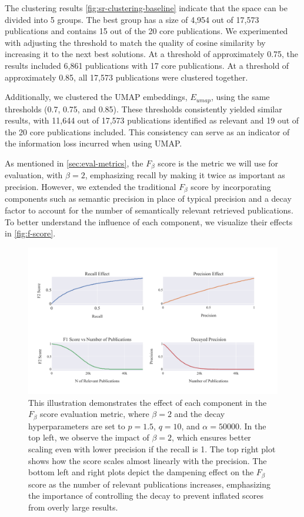 The clustering results \autoref{fig:sr-clustering-baseline} indicate that the space can be divided into 5 groups. The best group has a size of 4,954 out of 17,573 publications and contains 15 out of the 20 core publications. We experimented with adjusting the threshold to match the quality of cosine similarity by increasing it to the next best solutions. At a threshold of approximately 0.75, the results included 6,861 publications with 17 core publications. At a threshold of approximately 0.85, all 17,573 publications were clustered together.

Additionally, we clustered the UMAP embeddings, $E_{umap}$, using the same thresholds (0.7, 0.75, and 0.85). These thresholds consistently yielded similar results, with 11,644 out of 17,573 publications identified as relevant and 19 out of the 20 core publications included. This consistency can serve as an indicator of the information loss incurred when using UMAP.

As mentioned in \autoref{sec:eval-metrics}, the $F_{\beta}$ score is the metric we will use for evaluation, with $\beta=2$, emphasizing recall by making it twice as important as precision. However, we extended the traditional $F_{\beta}$ score by incorporating components such as semantic precision in place of typical precision and a decay factor to account for the number of semantically relevant retrieved publications. To better understand the influence of each component, we visualize their effects in \autoref{fig:f-score}.

\begin{figure}[!hb]
	\hspace*{-1cm}
	\includegraphics[scale=0.7]{pics/f_score.pdf}
	\caption[$F_{\beta}$ Components Analysis]{This illustration demonstrates the effect of each component in the $F_{\beta}$ score evaluation metric, where $\beta=2$ and the decay hyperparameters are set to $p=1.5$, $q=10$, and $\alpha=50000$. In the top left, we observe the impact of $\beta=2$, which ensures better scaling even with lower precision if the recall is 1. The top right plot shows how the score scales almost linearly with the precision. The bottom left and right plots depict the dampening effect on the $F_{\beta}$ score as the number of relevant publications increases, emphasizing the importance of controlling the decay to prevent inflated scores from overly large results.}\label{fig:f-score}
\end{figure}

